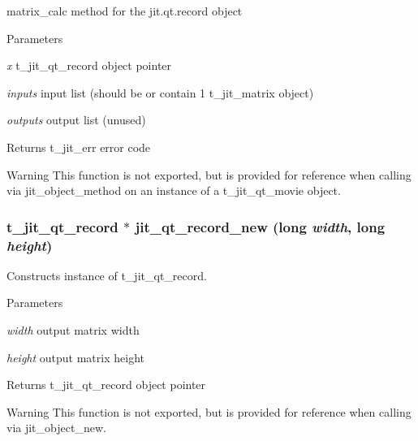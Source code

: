 matrix\_\-calc method for the jit.qt.record object 
\begin{DoxyParams}{Parameters}
\item[{\em x}]t\_\-jit\_\-qt\_\-record object pointer \item[{\em inputs}]input list (should be or contain 1 t\_\-jit\_\-matrix object) \item[{\em outputs}]output list (unused)\end{DoxyParams}
\begin{DoxyReturn}{Returns}
t\_\-jit\_\-err error code
\end{DoxyReturn}
\begin{DoxyWarning}{Warning}
This function is not exported, but is provided for reference when calling via jit\_\-object\_\-method on an instance of a t\_\-jit\_\-qt\_\-movie object. 
\end{DoxyWarning}
\hypertarget{group__qtrecordmod_ga7b978ef8ed5477c10ecabf38f7a9e8ea}{
\subsubsection[{jit\_\-qt\_\-record\_\-new}]{\setlength{\rightskip}{0pt plus 5cm}t\_\-jit\_\-qt\_\-record $\ast$ jit\_\-qt\_\-record\_\-new (long {\em width}, \/  long {\em height})}}
\label{group__qtrecordmod_ga7b978ef8ed5477c10ecabf38f7a9e8ea}


Constructs instance of t\_\-jit\_\-qt\_\-record. 
\begin{DoxyParams}{Parameters}
\item[{\em width}]output matrix width \item[{\em height}]output matrix height\end{DoxyParams}
\begin{DoxyReturn}{Returns}
t\_\-jit\_\-qt\_\-record object pointer
\end{DoxyReturn}
\begin{DoxyWarning}{Warning}
This function is not exported, but is provided for reference when calling via jit\_\-object\_\-new. 
\end{DoxyWarning}

